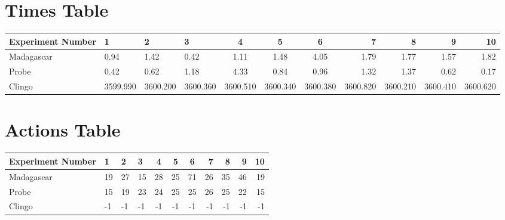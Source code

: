\documentclass[8pt]{article}
\begin{document}
\begin{landscape}
\section{Times Table}\begin{tabular}{ | l | l | l | l | c | c | c | r | r | r | r | }\hline
Experiment Number & 1 & 2 & 3 & 4 & 5 & 6 & 7 & 8 & 9 & 10\\  \hline
Madagascar & 0.94 & 1.42 & 0.42 & 1.11 & 1.48 & 4.05 & 1.79 & 1.77 & 1.57 & 1.82\\  \hline
Probe & 0.42 & 0.62 & 1.18 & 4.33 & 0.84 & 0.96 & 1.32 & 1.37 & 0.62 & 0.17\\  \hline
Clingo & 3599.990 & 3600.200 & 3600.360 & 3600.510 & 3600.340 & 3600.380 & 3600.820 & 3600.210 & 3600.410 & 3600.620\\  \hline
\end{tabular}
\section{Actions Table}\begin{tabular}{ | l | l | l | l | c | c | c | r | r | r | r | }\hline
Experiment Number & 1 & 2 & 3 & 4 & 5 & 6 & 7 & 8 & 9 & 10\\ \hline
 Madagascar & 19 & 27 & 15 & 28 & 25 & 71 & 26 & 35 & 46 & 19\\ \hline
 Probe & 15 & 19 & 23 & 24 & 25 & 25 & 26 & 25 & 22 & 15\\ \hline
 Clingo & -1 & -1 & -1 & -1 & -1 & -1 & -1 & -1 & -1 & -1\\ \hline
\end{tabular}
\end{landscape}
\end{document}
